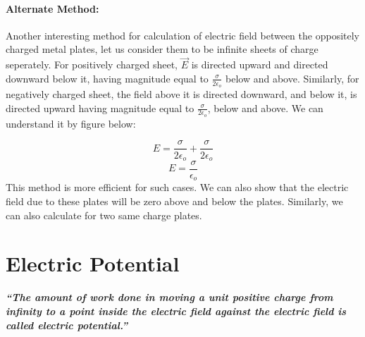 \paragraph{Alternate Method:}
Another interesting method for calculation of electric field between
the oppositely charged metal plates, let us consider them to be infinite
sheets of charge seperately. For positively charged sheet, $\vec{E}$
is directed upward and directed downward below it,
having magnitude equal to $\frac{\sigma}{2\epsilon_{o}}$ below and above.
Similarly, for negatively charged sheet, the field above it is directed downward,
and below it, is directed upward having magnitude equal to $\frac{\sigma}{2\epsilon_{o}}$,
below and above. We can understand it by figure below:

\begin{equation}
  E = \frac{\sigma}{2\epsilon_{o}} + \frac{\sigma}{2\epsilon_{o}} \nonumber
\end{equation}
\begin{equation}
  E = \frac{\sigma}{\epsilon_{o}} \nonumber
\end{equation}
This method is more efficient for such cases. We can also show that the
electric field due to these plates will be zero above and below the plates.
Similarly, we can also calculate for two same charge plates.

\section{Electric Potential}
\textit{\textbf{“The amount of work done in moving a unit positive charge
from infinity to a point inside the electric field
against the electric field is called electric potential.”}}
